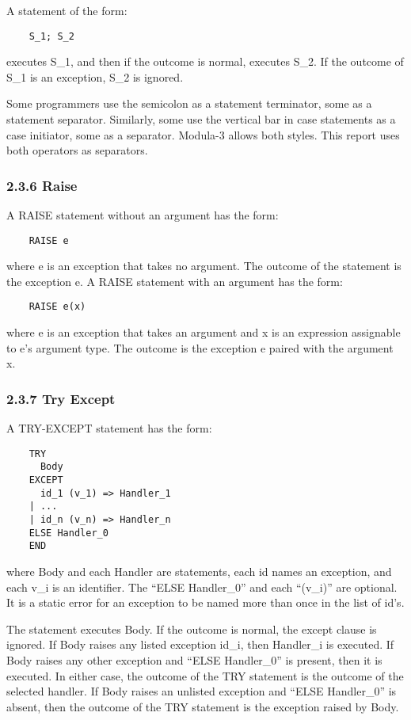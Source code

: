 \documentclass[10pt]{article}
\begin{document}
  A statement of the form: 
\begin{verbatim}
    S_1; S_2
\end{verbatim}
 executes S\_1, and then if the outcome is normal, executes S\_2. If the outcome of S\_1 is an exception, S\_2 is ignored. 


  Some programmers use the semicolon as a statement terminator, some as a statement separator. Similarly, some use the vertical bar in case statements as a case initiator, some as a separator. Modula-3 allows both styles. This report uses both operators as separators. 


 
\subsubsection*{2.3.6 Raise}


  A RAISE statement without an argument has the form: 
\begin{verbatim}
    RAISE e
\end{verbatim}
 where e is an exception that takes no argument. The outcome of the statement is the exception e. A RAISE statement with an argument has the form: 
\begin{verbatim}
    RAISE e(x)
\end{verbatim}
 where e is an exception that takes an argument and x is an expression assignable to e's argument type. The outcome is the exception e paired with the argument x. 


 
\subsubsection*{2.3.7 Try Except}


  A TRY-EXCEPT statement has the form: 
\begin{verbatim}
    TRY
      Body
    EXCEPT 
      id_1 (v_1) => Handler_1
    | ... 
    | id_n (v_n) => Handler_n
    ELSE Handler_0 
    END
\end{verbatim}
 where Body and each Handler are statements, each id names an exception, and each v\_i is an identifier. The ``ELSE Handler\_0'' and each ``(v\_i)'' are optional. It is a static error for an exception to be named more than once in the list of id's. 


 The statement executes Body. If the outcome is normal, the except clause is ignored. If Body raises any listed exception id\_i, then Handler\_i is executed. If Body raises any other exception and ``ELSE Handler\_0'' is present, then it is executed. In either case, the outcome of the TRY statement is the outcome of the selected handler. If Body raises an unlisted exception and ``ELSE Handler\_0'' is absent, then the outcome of the TRY statement is the exception raised by Body. 
\end{document}
